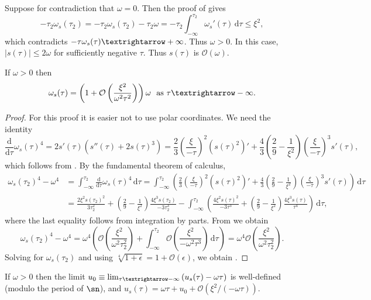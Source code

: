 Suppose for contradiction that $\omega=0$. Then the proof of  gives 
\[
-\tau_{2}\omega_{s}(\tau_{2})=-\tau_{2}\omega_{s}(\tau_{2})-\tau_{2}\omega=-\tau_{2}\int_{-\infty}^{\tau_{2}}\omega_{s}'(\tau)\,\mathrm{d}\tau\leq\xi^{2},
\]
 which contradicts $-\tau\omega_{s}(\tau)\textrightarrow+\infty$. Thus $\omega>0$. In this case, $\left|s(\tau)\right|\leq2\omega$ for sufficiently negative $\tau$. Thus $s(\tau)$ is $\mathcal{O}(\omega)$. 
\begin{lem}
\label{lem:omega-s-estimate}If $\omega>0$ then 
\begin{equation}
\omega_{s}(\tau)=\left(1+\mathcal{O}\left(\frac{\xi^{2}}{\omega^{2}\tau^{2}}\right)\right)\omega\ \textrm{ as }\tau\textrightarrow-\infty.\label{eq:omega-quadratic-asymptotic}
\end{equation}
\end{lem}

\begin{proof}
For this proof it is easier not to use polar coordinates. We need the identity 
\[
\frac{\mathrm{d}}{\mathrm{d}\tau}\omega_{s}(\tau)^{4}=2s'(\tau)\left(s''(\tau)+2s(\tau)^{3}\right)=\frac{2}{3}\left(\frac{\xi}{-\tau}\right)^{2}\left(s(\tau)^{2}\right)'+\frac{4}{3}\left(\frac{2}{9}-\frac{1}{\xi^{2}}\right)\left(\frac{\xi}{-\tau}\right)^{3}s'(\tau),
\]
 which follows from . By the fundamental theorem of calculus, 
\begin{align*}
\omega_{s}(\tau_{2})^{4}-\omega^{4} & =\int_{-\infty}^{\tau_{2}}\frac{\mathrm{d}}{\mathrm{d}\tau}\omega_{s}(\tau)^{4}\,\mathrm{d}\tau=\int_{-\infty}^{\tau_{2}}\left(\frac{2}{3}\left(\frac{\xi}{-\tau}\right)^{2}\left(s(\tau)^{2}\right)'+\frac{4}{3}\left(\frac{2}{9}-\frac{1}{\xi^{2}}\right)\left(\frac{\xi}{-\tau}\right)^{3}s'(\tau)\right)\,\mathrm{d}\tau\\
 & =\frac{2\xi^{2}s(\tau_{2})^{2}}{3\tau_{2}^{2}}+\left(\frac{2}{9}-\frac{1}{\xi^{2}}\right)\frac{4\xi^{3}s(\tau_{2})}{-3\tau_{2}^{3}}-\int_{-\infty}^{\tau_{2}}\left(\frac{4\xi^{2}s(\tau)^{2}}{-3\tau{}^{3}}+\left(\frac{2}{9}-\frac{1}{\xi^{2}}\right)\frac{4\xi^{3}s(\tau)}{\tau^{4}}\right)\,\mathrm{d}\tau,
\end{align*}
 where the last equality follows from integration by parts. From  we obtain 
\[
\omega_{s}(\tau_{2})^{4}-\omega^{4}=\omega^{4}\left(\mathcal{O}\left(\frac{\xi^{2}}{\omega^{2}\tau_{2}^{2}}\right)+\int_{-\infty}^{\tau_{2}}\mathcal{O}\left(\frac{\xi^{2}}{-\omega^{2}\tau^{3}}\right)\,\mathrm{d}\tau\right)=\omega^{4}\mathcal{O}\left(\frac{\xi^{2}}{\omega^{2}\tau_{2}^{2}}\right).
\]
 Solving for $\omega_{s}(\tau_{2})$ and using $\sqrt[4]{1+\epsilon}=1+\mathcal{O}\left(\epsilon\right)$, we obtain .  
\end{proof}
\begin{lem}
\label{lem:u0-error}If $\omega>0$ then the limit $u_{0}\equiv\lim_{\tau\textrightarrow-\infty}\left(u_{s}(\tau)-\omega\tau\right)$ is well-defined (modulo the period of $\sn$), and $u_{s}(\tau)=\omega\tau+u_{0}+\mathcal{O}(\xi^{2}/(-\omega\tau)).$ 
\end{lem}

